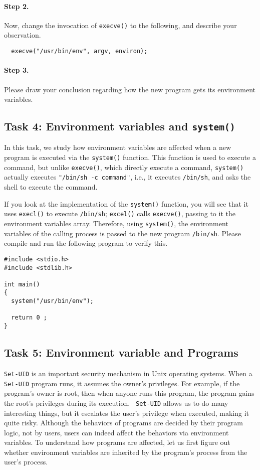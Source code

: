 \paragraph{Step 2.} Now, change the invocation of {\tt execve()} to the following, and 
describe your observation.
\begin{verbatim}
  execve("/usr/bin/env", argv, environ);
\end{verbatim}


\paragraph{Step 3.} Please draw your conclusion regarding how the new
program gets its environment variables. 


\subsection{Task 4: Environment variables and {\tt system()}}

In this task, we study how environment variables are affected 
when a new program is executed via the {\tt system()} function. This 
function is used to execute a command, but unlike
{\tt execve()}, which directly execute a command, {\tt system()}
actually executes {\tt "/bin/sh -c command"}, i.e., it
executes {\tt /bin/sh}, and asks the shell to execute the command.

If you look at the implementation of the {\tt system()} function, you will
see that it uses {\tt execl()} to execute {\tt /bin/sh}; {\tt excel()}
calls {\tt execve()}, passing to it the environment variables array. 
Therefore, using {\tt system()},  the environment variables of the calling process 
is passed to the new program {\tt /bin/sh}. Please compile and run the following program
to verify this. 


\begin{Verbatim}[frame=single]
#include <stdio.h>
#include <stdlib.h>

int main()
{
  system("/usr/bin/env");

  return 0 ;
}
\end{Verbatim}


\subsection{Task 5: Environment variable and \setuid Programs}

{\tt Set-UID} is an important security mechanism in Unix operating systems.
When a {\tt Set-UID} program runs, it assumes the owner's privileges. For
example, if the program's owner is root, then when anyone runs this
program, the program gains the root's privileges during its execution. {\tt
Set-UID} allows us to do many interesting things, but it escalates the
user's privilege when executed, making it quite risky. Although the
behaviors of \setuid programs are decided by their program logic, not by
users, users can indeed affect the behaviors via environment variables. 
To understand how \setuid programs are affected, let us first figure out
whether environment variables are inherited by the \setuid program's
process from the user's process.


